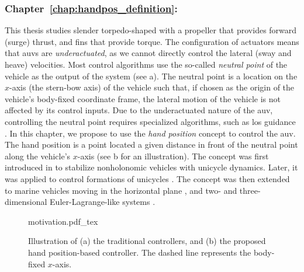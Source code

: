 

\subsubsection{Chapter~\ref{chap:handpos_definition}: }

This thesis studies slender torpedo-shaped  with a propeller that provides forward (surge) thrust, and fins that provide torque.
The configuration of actuators means that \glspl{auv} are \emph{underactuated}, as we cannot directly control the lateral (sway and heave) velocities.
Most control algorithms use the so-called \emph{neutral point} of the vehicle as the output of the system (see a).
The neutral point is a location on the $x$-axis (the stern-bow axis) of the vehicle such that, if chosen as the origin of the vehicle's body-fixed coordinate frame, the lateral motion of the vehicle is not affected by its control inputs.
Due to the underactuated nature of the \gls{auv}, controlling the neutral point requires specialized algorithms, such as \acrlong{los} guidance \cite{caharija_path-following-ILOS_2016,xiang_path-following-robust_2017,miao_path-following-curvilinear_2017,borhaug_straight_2007}.
In this chapter, we propose to use the \emph{hand position} concept to control the \gls{auv}.
The hand position is a point located a given distance in front of the neutral point along the vehicle's $x$-axis (see b for an illustration).
The concept was first introduced in \cite{pomet_hand-position_1992} to stabilize nonholonomic vehicles with unicycle dynamics.
Later, it was applied to control formations of unicycles \cite{lawton_hand-position-formation_2003}.
The concept was then extended to marine vehicles moving in the horizontal plane \cite{paliotta_trajectory_2019}, and two- and three-dimensional Euler-Lagrange-like systems \cite{cai_hand-position-rigidity-planar_2015,li_hand-position-rigidity-3d_2021}.

\begin{figure}[b]
    \centering
    \def\svgwidth{0.65\textwidth}
    {motivation.pdf_tex}
    \caption{Illustration of (a) the traditional controllers, and (b) the proposed hand position-based controller. The dashed line represents the body-fixed $x$-axis.}
    \label{fig:handpos_def_motivation}
\end{figure}

